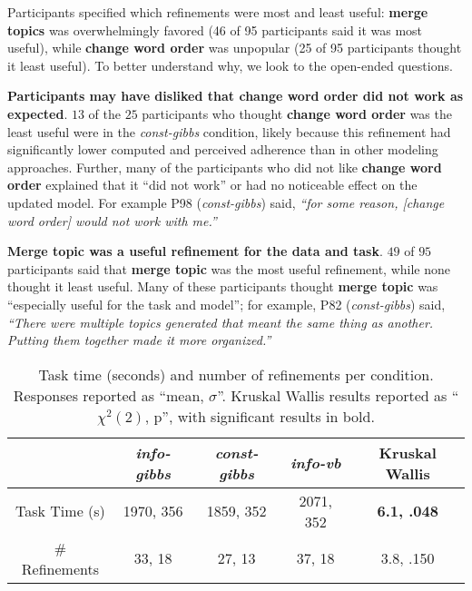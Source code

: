 Participants specified which refinements were most and least useful: \textbf{merge topics} was overwhelmingly favored (46 of 95 participants said it was most useful), while
\textbf{change word order} was unpopular (25 of 95 participants thought it least useful).
To better understand why, 
 we look to the open-ended questions.

\textbf{Participants may have disliked that change word order did not work as expected}.
$13$ of the $25$ participants who thought \textbf{change word order} was the least useful were in the
\textit{const-gibbs} condition, likely because
this refinement had significantly lower computed and perceived
adherence than in other modeling approaches. Further,
many of the participants who did not like \textbf{change word order} explained that it ``did not work'' or had no noticeable effect on the updated
model. For example P98 (\textit{const-gibbs}) said, \textit{``for some reason, [change word order] would not work with me.''} 

\textbf{Merge topic was a useful refinement for the data and task}.
$49$ of $95$ participants said that \textbf{merge topic} was the most
useful refinement, while none thought it least useful. Many of these participants thought \textbf{merge topic} was ``especially useful for the task and model''; for example, P82 (\textit{const-gibbs}) said, \textit{``There were multiple topics generated that meant the same thing as another. Putting them together made it more organized.''} 



 








\begin{table}[t]
  \caption{Task time (seconds) and number of refinements per condition. Responses reported as ``mean, $\sigma$''. Kruskal
    Wallis results reported as
    ``${\chi}^2(2)$, p'', with significant results in bold.}
  \label{tab:effort}
    \begin{center}
    \small
      \begin{tabular}{c c c c c}
        \hline
         & \textit{info-gibbs} & \textit{const-gibbs} & \textit{info-vb} & Kruskal Wallis \\
        \hline \hline
        Task Time (s) & 1970, 356 & 1859, 352 & 2071, 352 & \textbf{6.1, .048} \\
        \# Refinements & 33, 18 & 27, 13 & 37, 18 & 3.8, .150 \\
        \hline
      \end{tabular}
    \end{center}
    \bigskip\centering
\end{table}
